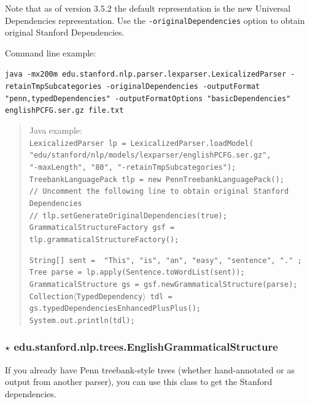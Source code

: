 \documentclass[11pt,letterpaper]{article}
\begin{document}
\noindent Note that as of version 3.5.2 the default representation is the new Universal Dependencies representation. 
Use the \texttt{-originalDependencies} option to obtain original Stanford Dependencies.

\bigskip

\noindent Command line example: \\
{\hangindent=0.4in
\raggedright\texttt{java -mx200m edu.stanford.nlp.parser.lexparser.LexicalizedParser -retainTmpSubcategories -originalDependencies -outputFormat "penn,typedDependencies" -outputFormatOptions "basicDependencies" englishPCFG.ser.gz file.txt}\\}

\begin{quote}
\hspace*{-0.375in}%
Java example: \\
\small\texttt{LexicalizedParser lp = LexicalizedParser.loadModel(\\
\hspace*{1.5in}"edu/stanford/nlp/models/lexparser/englishPCFG.ser.gz",\\
\hspace*{1.5in}"-maxLength", "80", "-retainTmpSubcategories"); \\
TreebankLanguagePack tlp = new PennTreebankLanguagePack(); \\
// Uncomment the following line to obtain original Stanford Dependencies\\
// tlp.setGenerateOriginalDependencies(true); \\
GrammaticalStructureFactory gsf = tlp.grammaticalStructureFactory();}

\bigskip

\noindent
\texttt{String[] sent = { "This", "is", "an", "easy", "sentence", "." }; \\
Tree parse = lp.apply(Sentence.toWordList(sent)); \\
GrammaticalStructure gs = gsf.newGrammaticalStructure(parse); \\
Collection$\langle$TypedDependency$\rangle$ tdl = gs.typedDependenciesEnhancedPlusPlus(); \\
System.out.println(tdl); }
\end{quote}

\subsubsection*{$\star$ \textbf{edu.stanford.nlp.trees.EnglishGrammaticalStructure}}
If you already have Penn treebank-style trees (whether hand-annotated or as output from another parser), you can use this class to get the Stanford dependencies.
\end{document}
